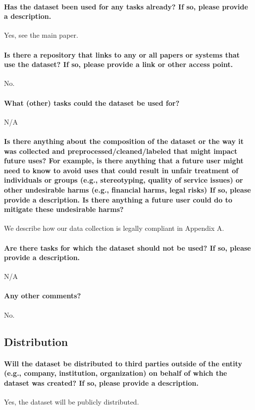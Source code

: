 \documentclass{article}
\begin{document}
\paragraph{Has the dataset been used for any tasks already? If so, please provide
a description.}
Yes, see the main paper.

\paragraph{Is there a repository that links to any or all papers or systems that
use the dataset? If so, please provide a link or other access point.}
No.

\paragraph{What (other) tasks could the dataset be used for?}
N/A

\paragraph{Is there anything about the composition of the dataset or the way
it was collected and preprocessed/cleaned/labeled that might impact future uses? For example, is there anything that a future user
might need to know to avoid uses that could result in unfair treatment
of individuals or groups (e.g., stereotyping, quality of service issues) or
other undesirable harms (e.g., financial harms, legal risks) If so, please
provide a description. Is there anything a future user could do to mitigate
these undesirable harms?}
We describe how our data collection is legally compliant in Appendix A.

\paragraph{Are there tasks for which the dataset should not be used? If so,
please provide a description.}
N/A

\paragraph{Any other comments?}
No.

\subsection{Distribution}
\paragraph{Will the dataset be distributed to third parties outside of the entity (e.g., company, institution, organization) on behalf of which
the dataset was created? If so, please provide a description.}
Yes, the dataset will be publicly distributed.
\end{document}
